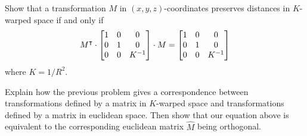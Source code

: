 \documentclass[newpage,hints,handout,noauthor,nooutcomes,12pt]{ximera}
\begin{document}
\begin{problem}
  Show that a transformation $M$ in $(x,y,z)$-coordinates preserves distances in
  $K$-warped space if and only if%
  \[
    M^\intercal \cdot\begin{bmatrix}
    1 & 0 & 0\\
    0 & 1 & 0\\
    0 & 0 & K^{-1}
    \end{bmatrix}
    \cdot M=\begin{bmatrix}
    1 & 0 & 0\\
    0 & 1 & 0\\
    0 & 0 & K^{-1}
    \end{bmatrix}
  \]
  where $K = 1/R^2$.
\begin{hint} 
  Explain how the previous problem gives a correspondence between
  transformations defined by a matrix in $K$-warped space and
  transformations defined by a matrix in euclidean space.  Then show
  that our equation above is equivalent to the corresponding euclidean
  matrix $\hat{M}$ being orthogonal.
\end{hint}
  


\end{problem}
\end{document}
